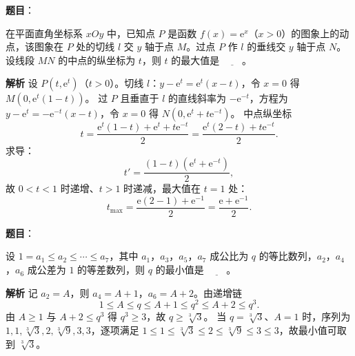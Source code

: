 \begin{answer}

\textbf{题目}：

在平面直角坐标系 $xOy$ 中，已知点 $P$ 是函数 $f(x)=\mathrm e^x$（$x>0$）的图象上的动点，该图象在 $P$ 处的切线 $l$ 交 $y$ 轴于点 $M$。过点 $P$ 作 $l$ 的垂线交 $y$ 轴于点 $N$。设线段 $MN$ 的中点的纵坐标为 $t$，则 $t$ 的最大值是 $\underline{\qquad}$。

\textbf{解析}
设 $P(t,\mathrm e^t)$（$t>0$）。切线 $l$：$y-\mathrm e^t=\mathrm e^t(x-t)$，令 $x=0$ 得 $M(0,\mathrm e^t(1-t))$。
过 $P$ 且垂直于 $l$ 的直线斜率为 $-\mathrm e^{-t}$，方程为 $y-\mathrm e^t=-\mathrm e^{-t}(x-t)$，令 $x=0$ 得 $N(0,\mathrm e^t+t\mathrm e^{-t})$。
中点纵坐标
\nopagebreak[4]
\[t=\frac{\mathrm e^t(1-t)+\mathrm e^t+t\mathrm e^{-t}}2=\frac{\mathrm e^t(2-t)+t\mathrm e^{-t}}2.\]
求导：
\nopagebreak[4]
\[t'=\frac{(1-t)(\mathrm e^t+\mathrm e^{-t})}{2},\]
故 $0<t<1$ 时递增、$t>1$ 时递减，最大值在 $t=1$ 处：
\nopagebreak[4]
\[t_{\max}=\frac{\mathrm e(2-1)+\mathrm e^{-1}}2=\frac{\mathrm e+\mathrm e^{-1}}2.\]


\end{answer}
\begin{answer}

\textbf{题目}：

设 $1=a_1\leqslant a_2\leqslant\cdots\leqslant a_7$，其中 $a_1$，$a_3$，$a_5$，$a_7$ 成公比为 $q$ 的等比数列，$a_2$，$a_4$，$a_6$ 成公差为 $1$ 的等差数列，则 $q$ 的最小值是 $\underline{\qquad}$。

\textbf{解析}
记 $a_2=A$，则 $a_4=A+1$，$a_6=A+2$。由递增链
\nopagebreak[4]
\[1\leqslant A\leqslant q\leqslant A+1\leqslant q^2\leqslant A+2\leqslant q^3.\]
由 $A\geqslant1$ 与 $A+2\leqslant q^3$ 得 $q^3\geqslant3$，故 $q\geqslant\sqrt[3]{3}$。
当 $q=\sqrt[3]{3}$、$A=1$ 时，序列为 $1,1,\sqrt[3]3,2,\sqrt[3]9,3,3$，逐项满足 $1\leqslant1\leqslant\sqrt[3]3\leqslant2\leqslant\sqrt[3]9\leqslant3\leqslant3$，故最小值可取到 $\sqrt[3]{3}$。


\end{answer}

